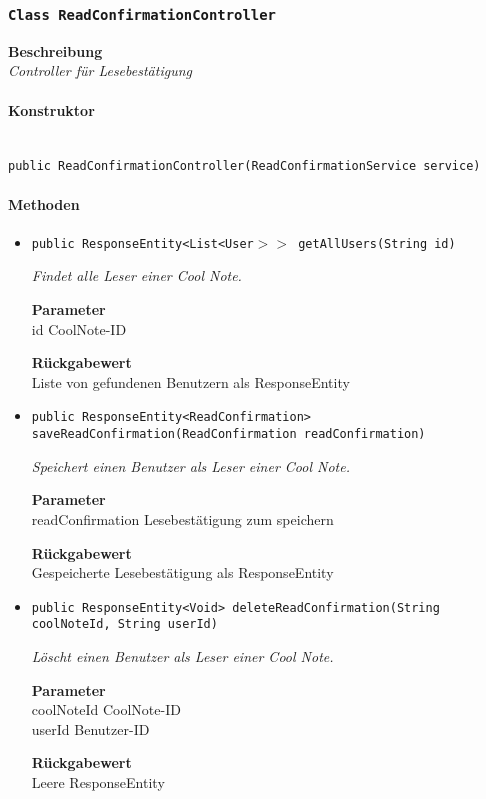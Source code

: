      \subsubsection{\texttt{Class ReadConfirmationController}}
     \textbf{Beschreibung} \\
     \textit{Controller für Lesebestätigung}
     \paragraph*{Konstruktor}\mbox{} \\
     \texttt{public ReadConfirmationController(ReadConfirmationService service)} \\
     \paragraph*{Methoden}
     \begin{itemize}
     	\item{\texttt{public ResponseEntity<List<User$>>$ getAllUsers(String id)}}
     	
     	\textit{Findet alle Leser einer Cool Note.}
     	
     	\textbf{Parameter} \\
     	id CoolNote-ID
     	
     	\textbf{Rückgabewert} \\
     	Liste von gefundenen Benutzern als ResponseEntity        \item{\texttt{public ResponseEntity<ReadConfirmation> saveReadConfirmation(ReadConfirmation readConfirmation)}}
     	
     	\textit{Speichert einen Benutzer als Leser einer Cool Note.}
     	
     	\textbf{Parameter} \\
     	readConfirmation Lesebestätigung zum speichern
     	
     	\textbf{Rückgabewert} \\
     	Gespeicherte Lesebestätigung als ResponseEntity        \item{\texttt{public ResponseEntity<Void> deleteReadConfirmation(String coolNoteId, String userId)}}
     	
     	\textit{Löscht einen Benutzer als Leser einer Cool Note.}
     	
     	\textbf{Parameter} \\
     	coolNoteId CoolNote-ID\\
     	userId Benutzer-ID
     	
     	\textbf{Rückgabewert} \\
     	Leere ResponseEntity
     \end{itemize}
